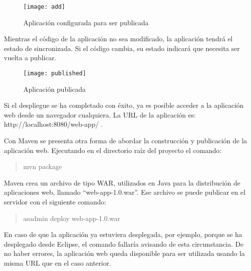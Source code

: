 \begin{figure}[!h]
  \centering
  \texttt{[image: add]}
  \caption{Aplicación configurada para ser publicada} \label{fig:add}
\end{figure}

Mientras el código de la aplicación no sea modificado, la aplicación tendrá el
estado de sincronizada. Si el código cambia, su estado indicará que necesita
ser vuelta a publicar.

\begin{figure}[!h]
  \centering
  \texttt{[image: published]}
  \caption{Aplicación publicada} \label{fig:publicada}
\end{figure}

Si el despliegue se ha completado con éxito, ya es posible acceder a la
aplicación web desde un navegador cualquiera. La URL de la aplicación es:
http://localhost:8080/web-app/ .


Con Maven se presenta otra forma de abordar la construcción y publicación de la
aplicación web. Ejecutando en el directorio raíz del proyecto el comando:
\begin{quotation}
  mvn package
\end{quotation}
Maven crea un archivo de tipo WAR, utilizados en Java para la distribución de
aplicaciones web, llamado ``web-app-1.0.war''. Ese archivo se puede publicar
en el servidor con el siguiente comando:
\begin{quotation}
  asadmin deploy web-app-1.0.war
\end{quotation}
En caso de que la aplicación ya estuviera desplegada, por ejemplo, porque se ha
desplegado desde Eclipse, el comando fallaría avisando de esta circunstancia.
De no haber errores, la aplicación web queda disponible para ser utilizada
usando la misma URL que en el caso anterior. 



